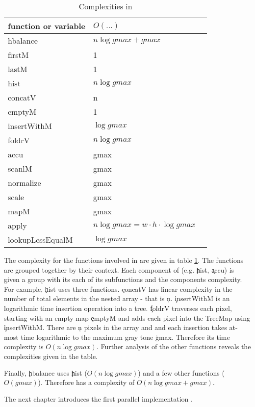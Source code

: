   \begin{table}[h!]
    \caption{Complexities in \seq}
    \label{table:seq}
    \centering
    \begin{tabular}{lll}
        \toprule
        function or variable & $O(...)$ \\
        \midrule
        hbalance          & $n \log gmax + gmax$ \\
        firstM           & 1\\ 
        lastM            & 1\\
        \midrule
        hist              & $n \log gmax$\\
        concatV          & n \\ 
        emptyM           & 1\\ 
        insertWithM      & $\log gmax$\\ 
        foldrV           & $n \log gmax$ \\ 
        \midrule
        accu              & gmax\\ 
        scanlM           & gmax\\
        \midrule
        normalize         & gmax\\ 
        scale             & gmax\\ 
        mapM             & gmax\\ 
        \midrule
        apply             & $n \log gmax = w \cdot h \cdot \log gmax$ \\
        lookupLessEqualM & $\log gmax$ \\ 
    \end{tabular}
  \end{table}
  
  The complexity for the functions involved in \seq are given
  in table \ref{table:seq}.
  The functions are grouped together by their context.
  Each component of \seq (e.g. \c{hist}, \c{accu}) is
  given a group with its each of its subfunctions and
  the components complexity.
  For example, \c{hist} uses three functions.
  \c{concatV} has linear complexity in the number
  of total elements in the nested array - that is \c{n}.
  \c{insertWithM} is an logarithmic time insertion operation
  into a tree. \c{foldrV} traverses each pixel,
  starting with an empty map \c{emptyM} and
  adds each pixel into the TreeMap using \c{insertWithM}.
  There are \c{n} pixels in the array and and each insertion
  takes at-most time logarithmic to the maximum gray tone \c{gmax}.
  Therefore its time complexity is $O(n \log gmax)$.
  Further analysis of the other functions reveals the complexities
  given in the table.
  
  
  Finally, \c{hbalance} uses
  \c{hist} ($O(n \log gmax)$) and a few
  other functions ($O(gmax)$). 
  Therefore \seq has a complexity of $O(n \log gmax + gmax)$.
  
  \p
  The next chapter introduces the first parallel implementation \man.
  
